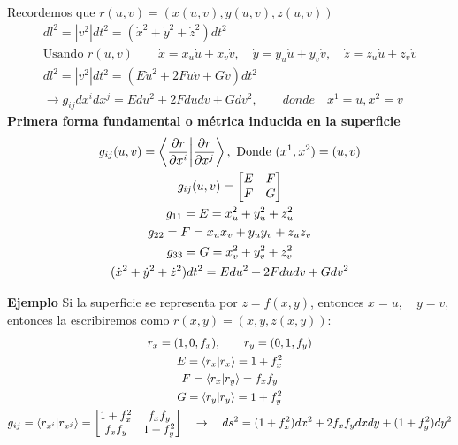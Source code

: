 \documentclass{article}
\newcommand{\caja}[3]{%
  \begin{tcolorbox}[colback=#1!5!white,colframe=#1!25!black,title=#2]
    #3
  \end{tcolorbox}%
}
\begin{document}
\caja{green}{Longitud de una curva en la superficie parametrizada por u y v}{
  Recordemos que $ r(u,v) = (x(u,v), y(u,v), z(u,v)) $
  \begin{gather}
    dl ^2 = \left|v ^2\right|dt ^2 = ( \dot x ^2+ \dot y ^2 + \dot z ^2 )dt ^2\\
    \text{Usando }r(u,v) \qquad \dot x = x_u \dot u + x_v \dot v, \quad \dot y = y_u \dot u + y_v \dot v, \quad \dot z = z_u \dot u + z_v \dot v\\
    dl ^2 = \left|v ^2\right|dt ^2 = (E\dot u ^2 + 2F \dot u \dot v + G \dot v)dt ^2\\
    \rightarrow g _{ij } dx ^ {i } dx ^ {j } = Edu ^2 + 2F dudv + Gdv ^2, \qquad donde \quad x ^ {1 } = u, x ^ {2 } = v 
  \end{gather}
  \tcblower
  \textbf{Primera forma fundamental o métrica inducida en la superficie }
  \begin{gather}
     g _{ij } (u,v ) = \bra{\frac{\partial r }{\partial x ^ {i }}}\ket{\frac{\partial r  }{\partial x ^ {j }}}, \text{ Donde } (x ^ {1 }, x^ {2} )  = (u,v)\\
     g _{ij } (u,v) = \begin{bmatrix}
         E & F \\
         F & G
     \end{bmatrix} \\
     g _{11 }  = E = x_u ^ {2 }+ y_u^2 + z_u^2 \\
     g_{22} = F = x_ux_v + y_u y_v + z_uz_v\\
     g _{33 }  = G = x_v^2 + y_v^2 + z_v^2\\
     (\dot x ^2 + \dot y ^2 + \dot z ^2)dt ^2 = Edu ^2 + 2 F dudv + G dv ^2
  \end{gather}
}
\textbf{Ejemplo} Si la superficie se representa por $ z = f\left(x,y \right) $, entonces $ x=u, \quad y = v  $, entonces la escribiremos como $ r\left(x,y\right)=(x,y, z\left(x,y\right)) $: 
\begin{gather}
  r_x  = (1,0,f_x), \qquad r_y  = (0,1, f_y)\\
  E = \bra{r_x }\ket{r_x } = 1+ f_x ^ {2 }\\
  F = \bra{r_x }\ket{r_y } = f_xf_y\\
  G = \bra{r_y }\ket{r_y } = 1+ f_y ^2\\
  g _{ij }  = \bra{r _{x ^ {i }} }\ket{r _{x ^ {j }} } =  \begin{bmatrix}
      1+ f_x ^2 & f_x f_y  \\
      f_x f_y  & 1+f_y ^2
  \end{bmatrix} \quad \rightarrow\quad ds ^2 = (1+ f_x ^2)dx ^2 + 2 f_xf_y dxdy + (1+ f_y ^2)dy ^2
\end{gather}
\end{document}
